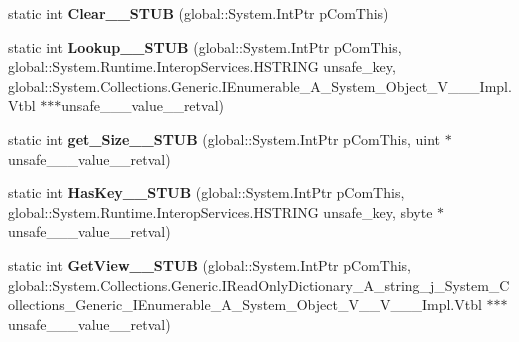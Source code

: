 \begin{DoxyCompactItemize}
static int {\bfseries Clear\+\_\+\+\_\+\+S\+T\+UB} (global\+::\+System.\+Int\+Ptr p\+Com\+This)
\item 
\mbox{\label{struct_system_1_1_collections_1_1_generic_1_1_i_dictionary___a__string__j___system___collectionsedc27740e4e948ffc8828d48179ed85a_a5599d7b6dbfa547f31e442c88263bc27}} 
static int {\bfseries Lookup\+\_\+\+\_\+\+S\+T\+UB} (global\+::\+System.\+Int\+Ptr p\+Com\+This, global\+::\+System.\+Runtime.\+Interop\+Services.\+H\+S\+T\+R\+I\+NG unsafe\+\_\+key, global\+::\+System.\+Collections.\+Generic.\+I\+Enumerable\+\_\+\+A\+\_\+\+System\+\_\+\+Object\+\_\+\+V\+\_\+\+\_\+\+\_\+\+Impl.\+Vtbl $\ast$$\ast$$\ast$unsafe\+\_\+\+\_\+\+\_\+value\+\_\+\+\_\+retval)
\item 
\mbox{\label{struct_system_1_1_collections_1_1_generic_1_1_i_dictionary___a__string__j___system___collectionsedc27740e4e948ffc8828d48179ed85a_a3a5c8f70d1d585c69946de641a8ddef8}} 
static int {\bfseries get\+\_\+\+Size\+\_\+\+\_\+\+S\+T\+UB} (global\+::\+System.\+Int\+Ptr p\+Com\+This, uint $\ast$unsafe\+\_\+\+\_\+\+\_\+value\+\_\+\+\_\+retval)
\item 
\mbox{\label{struct_system_1_1_collections_1_1_generic_1_1_i_dictionary___a__string__j___system___collectionsedc27740e4e948ffc8828d48179ed85a_a60ece21f6e529083c854e0b876b51b55}} 
static int {\bfseries Has\+Key\+\_\+\+\_\+\+S\+T\+UB} (global\+::\+System.\+Int\+Ptr p\+Com\+This, global\+::\+System.\+Runtime.\+Interop\+Services.\+H\+S\+T\+R\+I\+NG unsafe\+\_\+key, sbyte $\ast$unsafe\+\_\+\+\_\+\+\_\+value\+\_\+\+\_\+retval)
\item 
\mbox{\label{struct_system_1_1_collections_1_1_generic_1_1_i_dictionary___a__string__j___system___collectionsedc27740e4e948ffc8828d48179ed85a_a185cae3598daadd7bc2c99b2ac7a7434}} 
static int {\bfseries Get\+View\+\_\+\+\_\+\+S\+T\+UB} (global\+::\+System.\+Int\+Ptr p\+Com\+This, global\+::\+System.\+Collections.\+Generic.\+I\+Read\+Only\+Dictionary\+\_\+\+A\+\_\+string\+\_\+j\+\_\+\+System\+\_\+\+Collections\+\_\+\+Generic\+\_\+\+I\+Enumerable\+\_\+\+A\+\_\+\+System\+\_\+\+Object\+\_\+\+V\+\_\+\+\_\+\+V\+\_\+\+\_\+\+\_\+\+Impl.\+Vtbl $\ast$$\ast$$\ast$unsafe\+\_\+\+\_\+\+\_\+value\+\_\+\+\_\+retval)

\end{DoxyCompactItemize}
